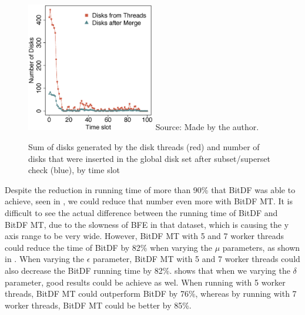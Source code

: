 {\begin{figure}[h!]
    \centering
    \caption{Sum of disks generated by the disk threads (red) and number of disks that were inserted in the global disk
        set after subset/superset check (blue), by time slot}
    \includegraphics[width=0.5\textwidth]{images/Brinkhoff_disks_threads.eps}
    \footnotesize{Source: Made by the author.}
    \label{fig:brinkhoff_disks_threads}
\end{figure}

Despite the reduction in running time of more than 90\% that BitDF was able to achieve, seen in ,
we could reduce that number even more with BitDF MT. It is difficult to see the actual difference between the running
time of BitDF and BitDF MT, due to the slowness of BFE in that dataset, which is causing the y axis range to be very
wide. However, BitDF MT with 5 and 7 worker threads could reduce the time of BitDF by 82\% when varying the $\mu$
parameters, as shown in . When varying the $\epsilon$ parameter, BitDF MT with 5
and 7 worker threads could also decrease the BitDF running time by 82\%.  shows
that when we varying the $\delta$ parameter, good results could be achieve as wel. When running with 5 worker threads,
BitDF MT could outperform BitDF by 76\%, whereas by running with 7 worker threads, BitDF MT could be better by 85\%.

}
